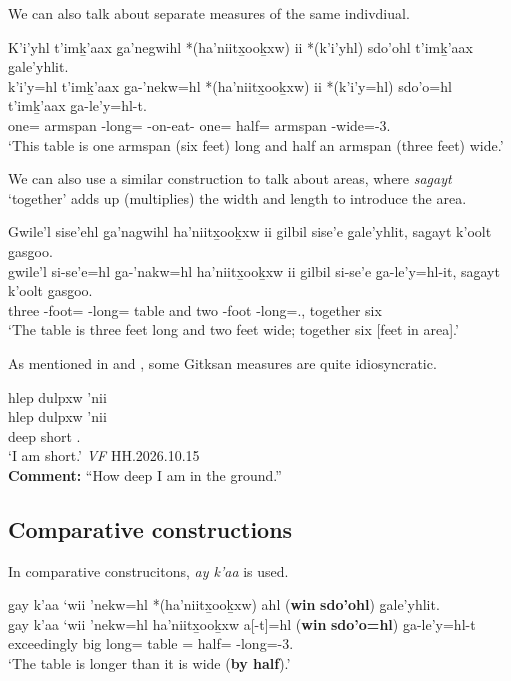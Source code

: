 \documentclass{article}
\begin{document}
We can also talk about separate measures of the same indivdiual.

\begin{exe}
    \ex \glll
    K’i’yhl t’imḵ’aax g̱a’negwihl *(ha’niitx̱ooḵxw) ii *(k’i’yhl) sdo’ohl t’imḵ’aax g̱ale’yhlit. \\
    k’i’y=hl t’imḵ’aax g̱a-’nekw=hl *(ha’niitx̱ooḵxw) ii *(k’i’y=hl) sdo’o=hl t’imḵ’aax g̱a-le’y=hl-t. \\
    one=\Cn{} armspan \Distr-long=\Cn{} \Ins-on-eat-\Val{} \Ccnj{} one=\Cn{} half=\Cn{} armspan \Distr-wide=\Cn{}-3.\Ii \\
    \glt `This table is one armspan (six feet) long and half an armspan (three feet) wide.'
\end{exe}

We can also use a similar construction to talk about areas, where \textit{sag̱ayt} `together' adds up (multiplies) the width and length to introduce the area.

\begin{exe}
    \ex \glll Gwile'l sise’ehl g̱a’nagwihl ha’niitx̱ooḵxw ii gilbil sise’e   g̱ale’yhlit, sag̱ayt k'oolt g̱asg̱oo. \\
     gwile'l si-se’e=hl g̱a-’nakw=hl ha’niitx̱ooḵxw ii gilbil si-se’e   g̱a-le’y=hl-it, sag̱ayt k'oolt g̱asg̱oo. \\
    three \Pl-foot=\Cn{} \Distr-long=\Cn{} table and two \Pl-foot \Distr-long=.\Ii, together six \Mass \\ 
    \glt `The table is three feet long and two feet wide; together six [feet in area].'
\end{exe}


As mentioned in \textcite{aonukiDifferentialMeasurePhrases2025} and \textcite{davisMorphosyntaxGitksan2026}, some Gitksan measures are quite idiosyncratic. 

\begin{exe}
    \ex \glll hlep dulpxw 'nii \\
    hlep dulpxw 'nii   \\
    deep short \Fsg{}.\Iii{} \\
    `I am short.' \textit{VF} \hfill HH.2026.10.15 \\ 
    \textbf{Comment:} ``How deep I am in the ground.''
\end{exe}


\subsection{Comparative constructions}
In comparative construcitons, \textit{ay k'aa} is used.
\begin{exe}
    \ex \glll g̱ay k’aa ‘wii ’nekw=hl *(ha’niitx̱ooḵxw) ahl (\textbf{win} \textbf{sdo’ohl}) g̱ale’yhlit. \\
    g̱ay k’aa ‘wii ’nekw=hl ha’niitx̱ooḵxw a[-t]=hl (\textbf{win} \textbf{sdo’o=hl}) g̱a-le’y=hl-t \\
    \Cntr{} exceedingly big long=\Cn{} table \Prep[-3.\Ii]=\Cn{} \Comp{} half=\Cn{} \Distr-long=\Cn{}-3.\Ii \\ 
    \glt `The table is longer than it is wide (\textbf{by half}).'
\end{exe}
\end{document}
